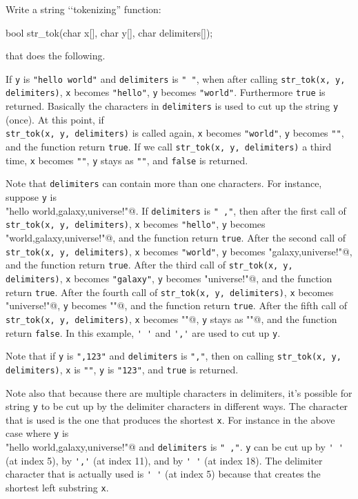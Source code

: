 Write a string \lq\lq tokenizing'' function:
\begin{console}
bool str_tok(char x[], char y[], char delimiters[]);
\end{console}
that does the following.

If \verb!y! is \verb!"hello world"! and
\texttt{delimiters} is \verb!" "!, when
after calling \verb!str_tok(x, y, delimiters)!,
\verb!x! becomes \texttt{"hello"},
\verb!y! becomes \verb!"world"!.
Furthermore \verb!true! is returned.
Basically the characters in \verb!delimiters! is used to cut up
the string \verb!y! (once).
At this point, if 
\\
\verb!str_tok(x, y, delimiters)!
is called again,
\verb!x! becomes \verb!"world"!,
\verb!y! becomes \verb!""!,
and the function return \verb!true!.
If we call \verb!str_tok(x, y, delimiters)!
a third time,
\verb!x! becomes \verb!""!,
\verb!y! stays as \verb!""!,
and \verb!false! is returned.

Note that \verb!delimiters! can contain more than one characters.
For instance, suppose
\verb!y! is
\\ \verb@"hello world,galaxy,universe!"@.
If \verb!delimiters! is \verb!" ,"!,
then
after the first call of
\\ \verb!str_tok(x, y, delimiters)!,
\verb!x! becomes \verb!"hello"!,
\verb!y! becomes \verb@"world,galaxy,universe!"@,
and the function return \verb!true!.
After the second call of
\verb!str_tok(x, y, delimiters)!,
\verb!x! becomes \verb!"world"!,
\verb!y! becomes \verb@"galaxy,universe!"@,
and the function return \verb!true!.
After the third call of
\verb!str_tok(x, y, delimiters)!,
\verb!x! becomes \verb!"galaxy"!,
\verb!y! becomes \verb@"universe!"@,
and the function return \verb!true!.
After the fourth call of
\verb!str_tok(x, y, delimiters)!,
\verb!x! becomes \verb@"universe!"@,
\verb!y! becomes \verb@""@,
and the function return \verb!true!.
After the fifth call of
\verb!str_tok(x, y, delimiters)!,
\verb!x! becomes \verb@""@,
\verb!y! stays as \verb@""@,
and the function return \verb!false!.
In this example, \verb!' '! and \verb!','! are used to cut up
\verb!y!.

Note that if \verb!y! is \verb!",123"!
and \verb!delimiters! is \verb!","!,
then on calling 
\verb!str_tok(x, y, delimiters)!,
\verb!x! is \verb!""!,
\verb!y! is \verb!"123"!,
and
\verb!true! is returned.

Note also that
 because there are multiple characters in delimiters,
 it's possible for string \verb!y! to be cut up by
 the delimiter characters in different ways.
 The character that is used is the one that produces the
 shortest \verb!x!.
 For instance in the above case where
 \verb!y! is
 \\
 \verb@"hello world,galaxy,universe!"@
 and
 \verb!delimiters! is
 \verb!" ,"!.
 \verb!y! can be cut up by \verb!' '! (at index 5),
 by \verb!','! (at index 11), and
 by \verb!' '! (at index 18).
 The delimiter character that is actually used is \verb!' '! (at index 5)
 because
 that creates the shortest left substring \verb!x!.
  
